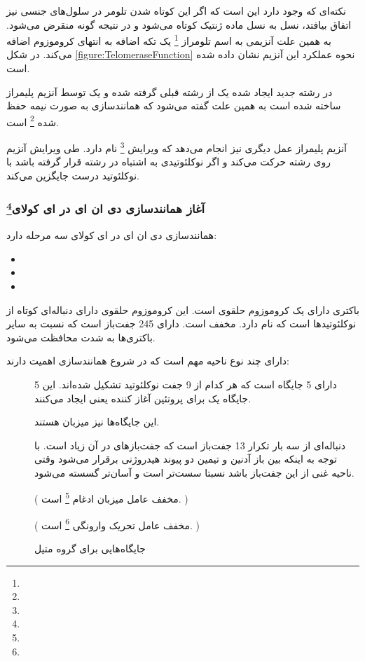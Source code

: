 نکته‌ای که وجود دارد این است که اگر این کوتاه شدن تلومر در سلول‌های جنسی نیز اتفاق بیافتد، نسل به نسل ماده ژنتیک کوتاه می‌شود و در نتیجه گونه منقرض می‌شود. به همین علت آنزیمی به اسم تلومراز
\footnote{}
یک تکه اضافه به انتهای کروموزوم اضافه می‌کند.
در شکل
\ref{figure:TelomeraseFunction}
نحوه عملکرد این آنزیم نشان داده شده است.

در رشته جدید ایجاد شده یک
از رشته قبلی گرفته شده و یک
توسط آنزیم 
پلیمراز ساخته شده است به همین علت گفته می‌شود که همانندسازی
به صورت نیمه حفظ شده
\footnote{}
 است.

آنزیم
پلیمراز عمل دیگری نیز انجام می‌دهد که ویرایش
\footnote{}
نام دارد. طی ویرایش آنزیم روی رشته حرکت می‌کند و اگر نوکلئوتیدی به اشتباه در رشته قرار گرفته باشد با نوکلئوتید درست جایگزین می‌کند.

\pagebreak
\subsubsection{آغاز همانندسازی دی ان ای در ای کولای\protect\footnote{}}

همانندسازی دی ان ای در ای کولای سه مرحله دارد:
\begin{itemize}
\item {}
\item {}
\item {}
\end{itemize}

باکتری
دارای یک کروموزوم حلقوی است. این کروموزوم حلقوی دارای دنباله‌ای کوتاه از نوکلئوتید‌ها است که
نام دارد.
مخفف
است.
دارای 245 جفت‌باز است که نسبت به سایر باکتری‌ها به شدت محافظت می‌شود.

دارای چند نوع ناحیه مهم است که در شروع همانند‌سازی اهمیت دارند:

\begin{description}
\item[]
دارای 5 جایگاه
است که هر کدام از 9 جفت نوکلئوتید تشکیل شده‌اند.  این 5 جایگاه یک
برای پروتئین آغاز کننده یعنی
ایجاد می‌کنند.
\item[]
این جایگاه‌ها نیز میزبان
هستند.
\item[]
دنباله‌ای از سه بار تکرار 13 جفت‌باز است که جفت‌باز‌های
در آن زیاد است. با توجه به اینکه بین باز آدنین و تیمین دو پیوند هیدروژنی برقرار می‌شود وقتی ناحیه غنی از این جفت‌باز باشد نسبتا سست‌تر است و آسان‌تر گسسته می‌شود.
\item[]
(
مخفف
عامل میزبان ادغام
\footnote{}
است.
)
\item[]
(
مخفف
عامل تحریک وارونگی
\footnote{}
است.
)
\item[]
جایگاه‌هایی برای گروه متیل
\end{description}

